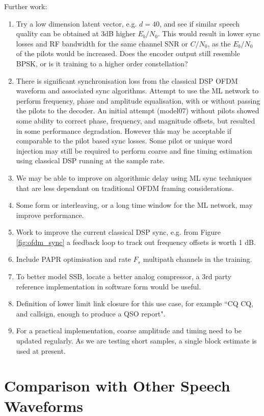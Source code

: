 \documentclass{article}
\begin{document}
Further work:
\begin{enumerate}
\item Try a low dimension latent vector, e.g. $d=40$, and see if similar speech quality can be obtained at 3dB higher $E_b/N_0$. This would result in lower sync losses and RF bandwidth for the same channel SNR or $C/N_0$, as the $E_b/N_0$ of the pilots would be increased. Does the encoder output still resemble BPSK, or is it training to a higher order constellation?
\item There is significant synchronisation loss from the classical DSP OFDM waveform and associated sync algorithms. Attempt to use the ML network to perform frequency, phase and amplitude equalisation, with or without passing the pilots to the decoder.  An initial attempt (model07) without pilots showed some ability to correct phase, frequency, and magnitude offsets, but resulted in some performance degradation. However this may be acceptable if comparable to the pilot based sync losses. Some pilot or unique word injection may still be required to perform coarse and fine timing estimation using classical DSP running at the sample rate.
\item We may be able to improve on algorithmic delay using ML sync techniques that are less dependant on traditional OFDM framing considerations.
\item Some form or interleaving, or a long time window for the ML network, may improve performance.
\item Work to improve the current classical DSP sync, e.g. from Figure \ref{fig:ofdm_sync} a feedback loop to track out frequency offsets is worth 1 dB.
\item Include PAPR optimisation and rate $F_s$ multipath channels in the training.
\item To better model SSB, locate a better analog compressor, a 3rd party reference implementation in software form would be useful.
\item Definition of lower limit link closure for this use case, for example ``CQ CQ, and callsign, enough to produce a QSO report".
\item For a practical implementation, coarse amplitude and timing need to be updated regularly. As we are testing short samples, a single block estimate is used at present.
\end{enumerate}

\section{Comparison with Other Speech Waveforms}
\end{document}
